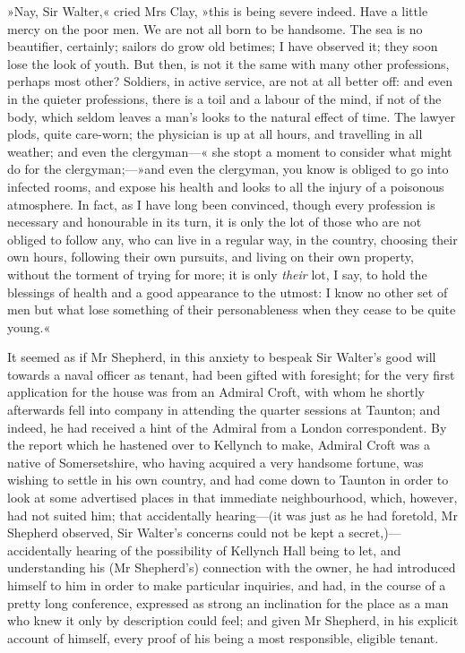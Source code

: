 »Nay, Sir Walter,« cried Mrs Clay, »this is being severe indeed. Have a little mercy on the poor men. We are not all born to be handsome. The sea is no beautifier, certainly; sailors do grow old betimes; I have observed it; they soon lose the look of youth. But then, is not it the same with many other professions, perhaps most other? Soldiers, in active service, are not at all better off: and even in the quieter professions, there is a toil and a labour of the mind, if not of the body, which seldom leaves a man's looks to the natural effect of time. The lawyer plods, quite care-worn; the physician is up at all hours, and travelling in all weather; and even the clergyman—« she stopt a moment to consider what might do for the clergyman;—»and even the clergyman, you know is obliged to go into infected rooms, and expose his health and looks to all the injury of a poisonous atmosphere. In fact, as I have long been convinced, though every profession is necessary and honourable in its turn, it is only the lot of those who are not obliged to follow any, who can live in a regular way, in the country, choosing their own hours, following their own pursuits, and living on their own property, without the torment of trying for more; it is only \textit{their} lot, I say, to hold the blessings of health and a good appearance to the utmost: I know no other set of men but what lose something of their personableness when they cease to be quite young.«

It seemed as if Mr Shepherd, in this anxiety to bespeak Sir Walter's good will towards a naval officer as tenant, had been gifted with foresight; for the very first application for the house was from an Admiral Croft, with whom he shortly afterwards fell into company in attending the quarter sessions at Taunton; and indeed, he had received a hint of the Admiral from a London correspondent. By the report which he hastened over to Kellynch to make, Admiral Croft was a native of Somersetshire, who having acquired a very handsome fortune, was wishing to settle in his own country, and had come down to Taunton in order to look at some advertised places in that immediate neighbourhood, which, however, had not suited him; that accidentally hearing—(it was just as he had foretold, Mr Shepherd observed, Sir Walter's concerns could not be kept a secret,)—accidentally hearing of the possibility of Kellynch Hall being to let, and understanding his (Mr Shepherd's) connection with the owner, he had introduced himself to him in order to make particular inquiries, and had, in the course of a pretty long conference, expressed as strong an inclination for the place as a man who knew it only by description could feel; and given Mr Shepherd, in his explicit account of himself, every proof of his being a most responsible, eligible tenant.

